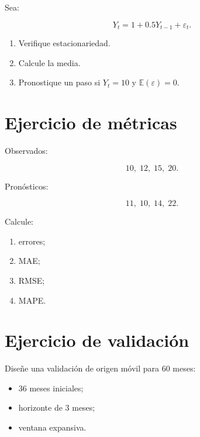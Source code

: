 \documentclass[
  spanish,
  10.5pt,
  letterpaper,
  DIV=11,
  numbers=noendperiod,
  oneside,
  open=any]{scrreprt}
\providecommand{\tightlist}{%
  \setlength{\itemsep}{0pt}\setlength{\parskip}{0pt}}
\theoremstyle{definition}
\theoremstyle{definition}
\theoremstyle{plain}
\theoremstyle{remark}
\begin{document}

Sea:

\[
Y_t=1+0.5Y_{t-1}+\varepsilon_t.
\]

\begin{enumerate}
\def\labelenumi{\arabic{enumi}.}
\tightlist
\item
  Verifique estacionariedad.
\item
  Calcule la media.
\item
  Pronostique un paso si \(Y_t=10\) y \(\mathbb{E}(\varepsilon)=0\).
\end{enumerate}

\section*{Ejercicio de métricas}\label{ejercicio-de-muxe9tricas}


Observados:

\[
10,\;12,\;15,\;20.
\]

Pronósticos:

\[
11,\;10,\;14,\;22.
\]

Calcule:

\begin{enumerate}
\def\labelenumi{\arabic{enumi}.}
\tightlist
\item
  errores;
\item
  MAE;
\item
  RMSE;
\item
  MAPE.
\end{enumerate}

\section*{Ejercicio de validación}\label{ejercicio-de-validaciuxf3n-1}


Diseñe una validación de origen móvil para 60 meses:

\begin{itemize}
\tightlist
\item
  36 meses iniciales;
\item
  horizonte de 3 meses;
\item
  ventana expansiva.
\end{itemize}
\end{document}
